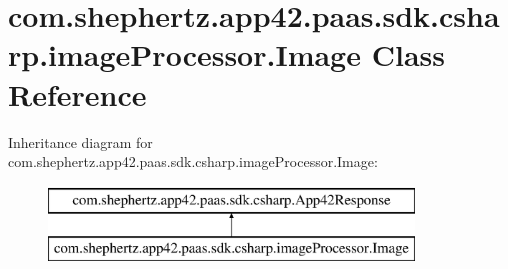 \hypertarget{classcom_1_1shephertz_1_1app42_1_1paas_1_1sdk_1_1csharp_1_1image_processor_1_1_image}{\section{com.\+shephertz.\+app42.\+paas.\+sdk.\+csharp.\+image\+Processor.\+Image Class Reference}
\label{classcom_1_1shephertz_1_1app42_1_1paas_1_1sdk_1_1csharp_1_1image_processor_1_1_image}
}
Inheritance diagram for com.\+shephertz.\+app42.\+paas.\+sdk.\+csharp.\+image\+Processor.\+Image\+:\begin{figure}[H]
\begin{center}
\leavevmode
\includegraphics[height=2.000000cm]{classcom_1_1shephertz_1_1app42_1_1paas_1_1sdk_1_1csharp_1_1image_processor_1_1_image}
\end{center}
\end{figure}
